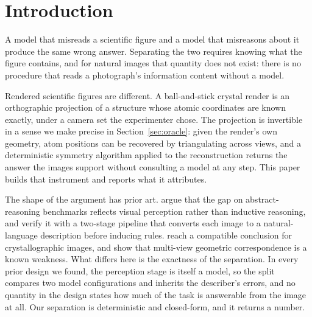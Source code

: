 \section{Introduction}
A model that misreads a scientific figure and a model that misreasons about it produce the same wrong
answer. Separating the two requires knowing what the figure contains, and for natural images that quantity
does not exist: there is no procedure that reads a photograph's information content without a model.

Rendered scientific figures are different. A ball-and-stick crystal render is an orthographic projection of
a structure whose atomic coordinates are known exactly, under a camera set the experimenter chose. The
projection is invertible in a sense we make precise in Section~\ref{sec:oracle}: given the render's own
geometry, atom positions can be recovered by triangulating across views, and a deterministic symmetry
algorithm applied to the reconstruction returns the answer the images support without consulting a model at
any step. This paper builds that instrument and reports what it attributes.

The shape of the argument has prior art. \citet{arc2512} argue that the gap on abstract-reasoning
benchmarks reflects visual perception rather than inductive reasoning, and verify it with a two-stage
pipeline that converts each image to a natural-language description before inducing rules.
\citet{xcrys2506} reach a compatible conclusion for crystallographic images, and \citet{allangles2504} show
that multi-view geometric correspondence is a known weakness. What differs here is the exactness of the
separation. In every prior design we found, the perception stage is itself a model, so the split compares
two model configurations and inherits the describer's errors, and no quantity in the design states how much
of the task is answerable from the image at all. Our separation is deterministic and closed-form, and it
returns a number.

